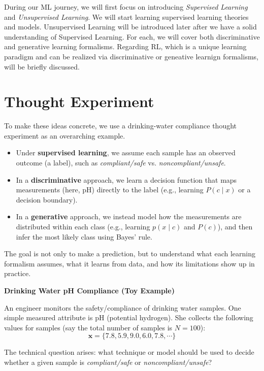 \documentclass[12pt]{article}
\begin{document}
During our ML journey, we will first focus on introducing \textit{Supervised Learning} and \textit{Unsupervised Learning}. We will start learning supervised learning theories and models. Unsupervised Learning will be introduced later after we have a solid understanding of Supervised Learning. For each, we will cover both discriminative and generative learning formalisms. Regarding RL, which is a unique learning paradigm and can be realized via discriminative or geneative learnign formalisms, will be briefly discussed. 


\section{Thought Experiment}

To make these ideas concrete, we use a drinking-water compliance thought experiment as an overarching example.

\begin{itemize}
\item Under \textbf{supervised learning}, we assume each sample has an observed outcome (a label), such as \textit{compliant/safe} vs. \textit{noncompliant/unsafe}.
\item In a \textbf{discriminative} approach, we learn a decision function that maps measurements (here, pH) directly to the label (e.g., learning $P(c\mid x)$ or a decision boundary).
\item In a \textbf{generative} approach, we instead model how the measurements are distributed within each class (e.g., learning $p(x\mid c)$ and $P(c)$), and then infer the most likely class using Bayes' rule.
\end{itemize}

The goal is not only to make a prediction, but to understand what each learning formalism assumes, what it learns from data, and how its limitations show up in practice.

\begin{ex-box}
\noindent \textbf{Drinking Water pH Compliance (Toy Example)}

An engineer monitors the safety/compliance of drinking water samples. One simple measured attribute is pH (potential hydrogen). She collects the following values for samples (say the total number of samples is \(N = 100\)):
\[
\bm{x} = \{7.8, 5.9, 9.0, 6.0, 7.8, \cdots \}
\]

The technical question arises: what technique or model should be used to decide whether a given sample is \textit{compliant/safe} or \textit{noncompliant/unsafe}?
\end{ex-box}
\end{document}
